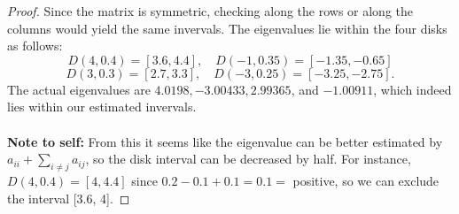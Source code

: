 \begin{proof}
Since the matrix is symmetric, checking along the rows or along the columns would yield the same invervals. The eigenvalues lie within the four disks as follows:
$$D(4, 0.4) = [3.6, 4.4], \quad D(-1, 0.35) = [-1.35, -0.65]$$
$$ D(3, 0.3) = [2.7, 3.3], \quad D(-3, 0.25) = [-3.25, -2.75].$$
The actual eigenvalues are $4.0198, -3.00433, 2.99365$, and $-1.00911$, which indeed lies within our estimated invervals. \\
\\
\textbf{Note to self:} From this it seems like the eigenvalue can be better estimated by $a_{ii} + \sum_{i \neq j} a_{ij} $, so the disk interval can be decreased by half. For instance, $ D(4,0.4) = [4, 4.4]$ since $0.2-0.1+0.1 = 0.1 =$ positive, so we can exclude the interval [3.6, 4].
\end{proof}
